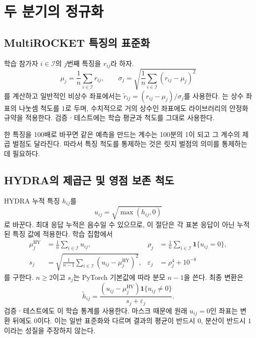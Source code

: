 \documentclass[11pt,a4paper]{article}
\newcommand{\ind}{\mathbf{1}}
\newcommand{\code}[1]{\texttt{\detokenize{#1}}}
\DeclareMathOperator{\HY}{HY}
\numberwithin{equation}{section}
\begin{document}
\section{두 분기의 정규화}
\subsection{MultiROCKET 특징의 표준화}
학습 참가자 \(i\in\mathcal I\)의 \(j\)번째 특징을 \(r_{ij}\)라 하자.
\begin{equation}
 \mu_j=\frac1n\sum_{i\in\mathcal I}r_{ij},\qquad
 \sigma_j=\sqrt{\frac1n\sum_{i\in\mathcal I}(r_{ij}-\mu_j)^2}
\end{equation}
를 계산하고 일반적인 비상수 좌표에서는
\(\widetilde r_{ij}=(r_{ij}-\mu_j)/\sigma_j\)를 사용한다.
\code{StandardScaler}는 상수 좌표의 나눗셈 척도를 \(1\)로 두며,
수치적으로 거의 상수인 좌표에도 라이브러리의 안정화 규약을 적용한다.
검증ㆍ테스트에는 학습 평균과 척도를 그대로 사용한다.

한 특징을 100배로 바꾸면 같은 예측을 만드는 계수는 100분의 1이 되고
그 계수의 제곱 벌점도 달라진다.
따라서 특징 척도를 통제하는 것은 릿지 벌점의 의미를 통제하는 데 필요하다.

\subsection{HYDRA의 제곱근 및 영점 보존 척도}
HYDRA 누적 특징 \(h_{ij}\)를
\begin{equation}
 u_{ij}=\sqrt{\max(h_{ij},0)}
\end{equation}
로 바꾼다. 최대 응답 누적은 음수일 수 있으므로,
이 절단은 각 표본 응답이 아닌 누적된 특징 값에 적용한다.
학습 집합에서
\begin{align}
 \mu_j^{\HY}&=\frac1n\sum_{i\in\mathcal I}u_{ij},&
 \rho_j&=\frac1n\sum_{i\in\mathcal I}\ind\{u_{ij}=0\},\\
 s_j&=\sqrt{\frac1{n-1}\sum_{i\in\mathcal I}(u_{ij}-\mu_j^{\HY})^2},&
 \varepsilon_j&=\rho_j^4+10^{-8}
\end{align}
를 구한다. \(n\geq2\)이고 \(s_j\)는 PyTorch 기본값에 따라 분모 \(n-1\)을 쓴다.
최종 변환은
\begin{equation}
 \widetilde h_{ij}
 =\frac{(u_{ij}-\mu_j^{\HY})\ind\{u_{ij}\neq0\}}{s_j+\varepsilon_j}.
\end{equation}
검증ㆍ테스트에도 이 학습 통계를 사용한다.
마스크 때문에 원래 \(u_{ij}=0\)인 좌표는 변환 뒤에도 \(0\)이다.
이는 일반 표준화와 다르며 결과의 평균이 반드시 \(0\),
분산이 반드시 \(1\)이라는 성질을 주장하지 않는다.
\end{document}
